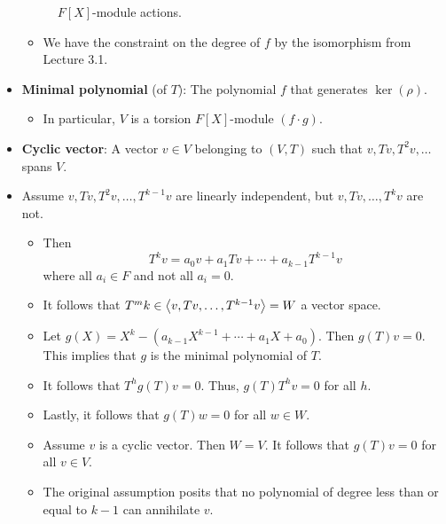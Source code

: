 \documentclass[../notes.tex]{subfiles}
\begin{document}
\begin{itemize}
\begin{figure}[H]
        \caption{$F[X]$-module actions.}
        \label{fig:fXmodAction}
    \end{figure}
    \begin{itemize}
        \item We have the constraint on the degree of $f$ by the isomorphism from Lecture 3.1.
    \end{itemize}
    \item \textbf{Minimal polynomial} (of $T$): The polynomial $f$ that generates $\ker(\rho)$.
    \begin{itemize}
        \item In particular, $V$ is a torsion $F[X]$-module $(f\cdot g)$.
    \end{itemize}
    \item \textbf{Cyclic vector}: A vector $v\in V$ belonging to $(V,T)$ such that $v,Tv,T^2v,\dots$ spans $V$.
    \item Assume $v,Tv,T^2v,\dots,T^{k-1}v$ are linearly independent, but $v,Tv,\dots,T^kv$ are not.
    \begin{itemize}
        \item Then
        \begin{equation*}
            T^kv = a_0v+a_1Tv+\cdots+a_{k-1}T^{k-1}v
        \end{equation*}
        where all $a_i\in F$ and not all $a_i=0$.
        \item It follows that $T^mk\in\left\langle{v,Tv,\dots,T^{k-1}v}\right\rangle=W$ a vector space.
        \item Let $g(X)=X^k-(a_{k-1}X^{k-1}+\cdots+a_1X+a_0)$. Then $g(T)v=0$. This implies that $g$ is the minimal polynomial of $T$.
        \item It follows that $T^hg(T)v=0$. Thus, $g(T)T^hv=0$ for all $h$.
        \item Lastly, it follows that $g(T)w=0$ for all $w\in W$.
        \item Assume $v$ is a cyclic vector. Then $W=V$. It follows that $g(T)v=0$ for all $v\in V$.
        \item The original assumption posits that no polynomial of degree less than or equal to $k-1$ can annihilate $v$.
    \end{itemize}

\end{itemize}
\end{document}
